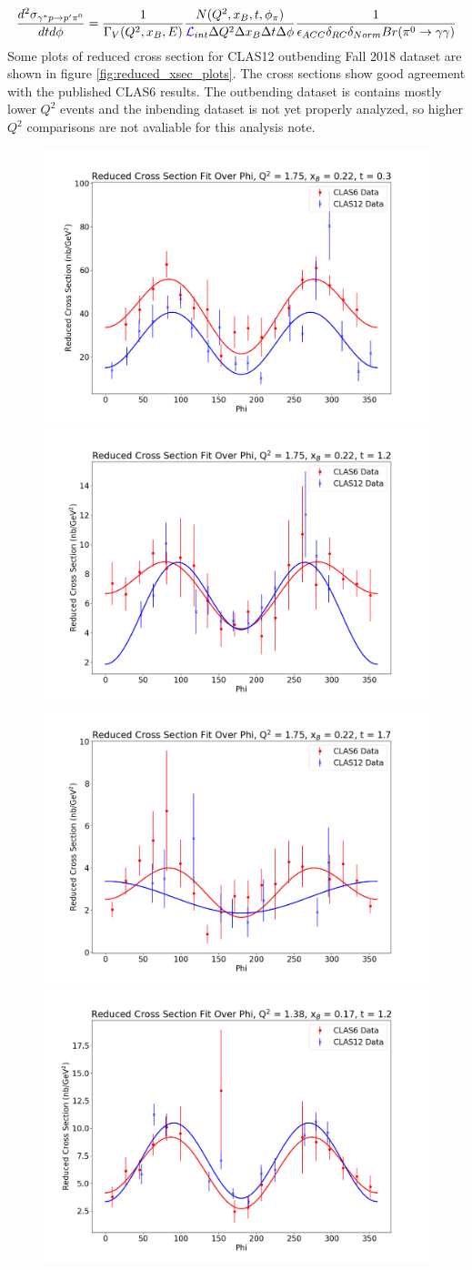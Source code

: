  \begin{equation}\label{xsec_red_full}
    \frac{d^2\sigma_{\gamma^*p \rightarrow p'\pi^0}}{dtd\phi} = \frac{1}{\Gamma_V(Q^2,x_B,E)} \frac{N(Q^2,x_B,t,\phi_{\pi})}{\textcolor{blue}{ \mathcal{L}}_{int}\Delta Q^2\Delta x_B\Delta t\Delta \phi} \frac{1}{\epsilon_{ACC} \delta_{RC} \delta_{Norm} Br(\pi^0 \rightarrow \gamma \gamma)}
\end{equation}
Some plots of reduced cross section for CLAS12 outbending Fall 2018 dataset are shown in figure \ref{fig:reduced_xsec_plots}. The cross sections show good agreement with the published CLAS6 results. The outbending dataset is contains mostly lower $Q^2$ events and the inbending dataset is not yet properly analyzed, so higher $Q^2$ comparisons are not avaliable for this analysis note. 


\begin{figure}[hbt]
	\centering
	\includegraphics[page=125,width=0.3\linewidth]{Chapters/Ch5-Further/basic_cross_sections/pics/ReducedCrossSectionFitOverPhi_Q2175_x_B022_t03.png}
	\includegraphics[page=123,width=0.3\linewidth]{Chapters/Ch5-Further/basic_cross_sections/pics/ReducedCrossSectionFitOverPhi_Q2175_x_B022_t12.png}
	\includegraphics[page=128,width=0.3\linewidth]{Chapters/Ch5-Further/basic_cross_sections/pics/ReducedCrossSectionFitOverPhi_Q2175_x_B022_t17.png}
	\includegraphics[page=130,width=0.3\linewidth]{Chapters/Ch5-Further/basic_cross_sections/pics/ReducedCrossSectionFitOverPhi_Q2138_x_B017_t12.png}

\end{figure}
